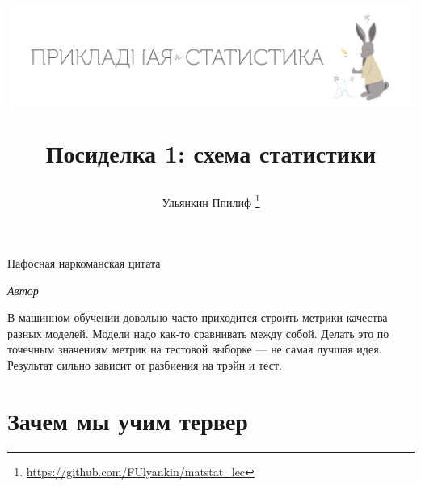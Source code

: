 \documentclass[12pt, a4paper, oneside]{article}
\title{
\begin{center} 
\includegraphics[width=0.99\textwidth]{logo.png}
\end{center}

Посиделка 1: схема статистики}
\date{ } %
\author{Ульянкин Ппилиф \thanks{\url{https://github.com/FUlyankin/matstat\_lec}}}
\begin{document}

\maketitle

\epigraph{Пафосная наркоманская цитата}{\textit{Автор}}

В машинном обучении довольно часто приходится строить метрики качества разных моделей. Модели надо как-то сравнивать между собой. Делать это по точечным значениям метрик на тестовой выборке --- не самая лучшая идея. Результат сильно зависит от разбиения на трэйн и тест. 



\section{Зачем мы учим тервер}
\end{document}
